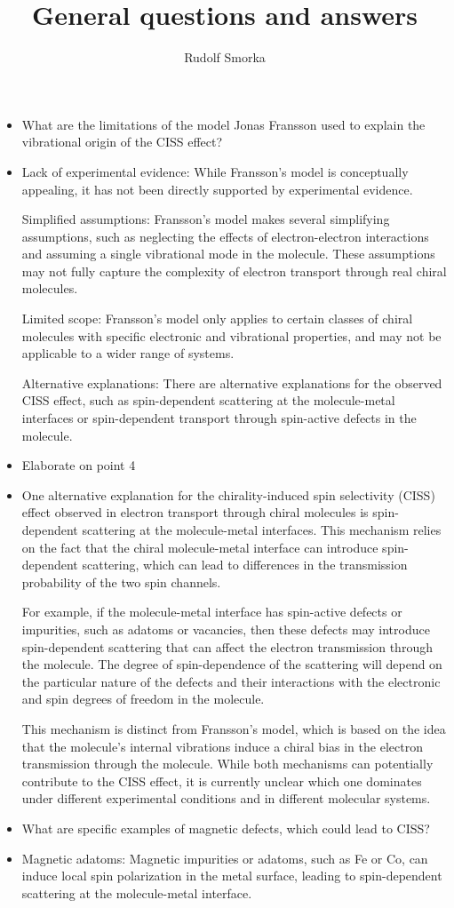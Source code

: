 \documentclass{article}
\begin{document}
\title{General questions and answers}
\author{Rudolf Smorka}
\maketitle
\begin{itemize}
	\item[Q:] What are the limitations of the model Jonas Fransson used to explain the vibrational origin of the CISS effect?
	\item[A:] Lack of experimental evidence: While Fransson's model is conceptually appealing, it has not been directly supported by experimental evidence.
	
	Simplified assumptions: Fransson's model makes several simplifying assumptions, such as neglecting the effects of electron-electron interactions and assuming a single vibrational mode in the molecule. These assumptions may not fully capture the complexity of electron transport through real chiral molecules.
	
	Limited scope: Fransson's model only applies to certain classes of chiral molecules with specific electronic and vibrational properties, and may not be applicable to a wider range of systems.
	
	Alternative explanations: There are alternative explanations for the observed CISS effect, such as spin-dependent scattering at the molecule-metal interfaces or spin-dependent transport through spin-active defects in the molecule. 
	\item[Q:] Elaborate on point 4
	\item[A:] One alternative explanation for the chirality-induced spin selectivity (CISS) effect observed in electron transport through chiral molecules is spin-dependent scattering at the molecule-metal interfaces. This mechanism relies on the fact that the chiral molecule-metal interface can introduce spin-dependent scattering, which can lead to differences in the transmission probability of the two spin channels.
	
	For example, if the molecule-metal interface has spin-active defects or impurities, such as adatoms or vacancies, then these defects may introduce spin-dependent scattering that can affect the electron transmission through the molecule. The degree of spin-dependence of the scattering will depend on the particular nature of the defects and their interactions with the electronic and spin degrees of freedom in the molecule.
	
	This mechanism is distinct from Fransson's model, which is based on the idea that the molecule's internal vibrations induce a chiral bias in the electron transmission through the molecule. While both mechanisms can potentially contribute to the CISS effect, it is currently unclear which one dominates under different experimental conditions and in different molecular systems.
	\item[Q:] What are specific examples of magnetic defects, which could lead to CISS?
	\item[A:] Magnetic adatoms: Magnetic impurities or adatoms, such as Fe or Co, can induce local spin polarization in the metal surface, leading to spin-dependent scattering at the molecule-metal interface.
	

\end{itemize}
\end{document}
